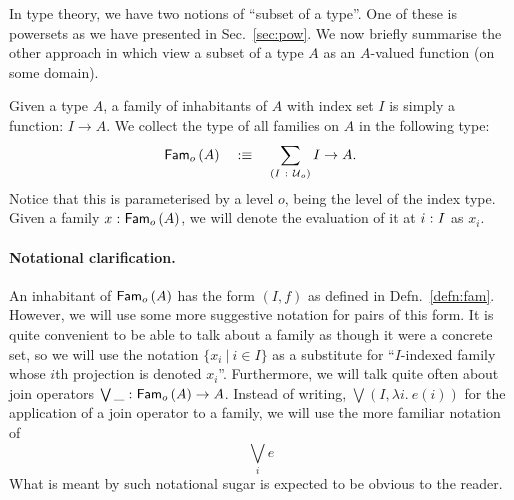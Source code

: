 In type theory, we have two notions of ``subset of a type''. One of these is powersets
as we have presented in Sec.~\ref{sec:pow}. We now briefly summarise the other approach
in which view a subset of a type $A$ as an $A$-valued function (on some domain).

\begin{defn}[Family]\label{defn:fam}
  Given a type $A$, a family of inhabitants of $A$ with index set $I$ is simply a
  function: $I \rightarrow A$. We collect the type of all families on $A$ in the following type:
  \begin{equation*}
    \mathsf{Fam}_{o}\left(A\right) \quad:\equiv\quad \sum_{(I~:~\mathcal{U}{}_o)} I \rightarrow A.
  \end{equation*}
  Notice that this is parameterised by a level $o$, being the level of the index type.
  Given a family $x\hspace{0.1mm}:\hspace{0.1mm}\mathsf{Fam}_{o}\left(A\right)$, we will denote the evaluation of it at
  $i\hspace{0.1mm}:\hspace{0.1mm}I$ as $x_i$.
\end{defn}

\paragraph*{Notational clarification.} An inhabitant of $\mathsf{Fam}_{o}\left(A\right)$ has the form
$(I, f)$ as defined in Defn.~\ref{defn:fam}. However, we will use some more suggestive
notation for pairs of this form. It is quite convenient to be able to talk about a family
as though it were a concrete set, so we will use the notation $\{ x_i ~|~ i \in I \}$ as a
substitute for ``$I$-indexed family whose $i$th projection is denoted $x_i$''. Furthermore,
we will talk quite often about join operators $\bigvee\_\hspace{0.1mm}:\hspace{0.1mm}\mathsf{Fam}_{o}\left(A\right) \rightarrow A$. Instead of
writing, $\bigvee (I, \lambda i.~e(i))$ for the application of a join operator to a family, we will
use the more familiar notation of
\begin{equation}\label{eqn:join-syntax}
  \bigvee_i e
\end{equation}
What is meant by such notational sugar is expected to be obvious to the reader.

